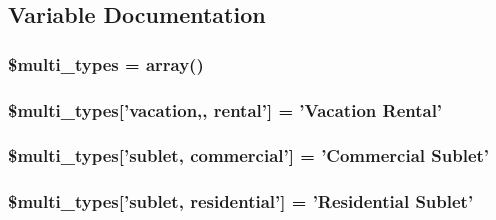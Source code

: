 \subsection{Variable Documentation}
\hypertarget{property__parts_8php_ab4fafae45f9617d14e385aa7a46febfd}{
\subsubsection[{\$multi\_\-types}]{\setlength{\rightskip}{0pt plus 5cm}\$multi\_\-types = array()}}
\label{db/d70/property__parts_8php_ab4fafae45f9617d14e385aa7a46febfd}
\hypertarget{property__parts_8php_a84f08c325359c2ffc08a14f7a1397ca2}{
\subsubsection[{\$multi\_\-types}]{\setlength{\rightskip}{0pt plus 5cm}\$multi\_\-types\mbox{[}'vacation,, rental'\mbox{]} = 'Vacation Rental'}}
\label{db/d70/property__parts_8php_a84f08c325359c2ffc08a14f7a1397ca2}
\hypertarget{property__parts_8php_a527d17f35f9614ce95a35a6dd6c391c3}{
\subsubsection[{\$multi\_\-types}]{\setlength{\rightskip}{0pt plus 5cm}\$multi\_\-types\mbox{[}'sublet, commercial'\mbox{]} = 'Commercial Sublet'}}
\label{db/d70/property__parts_8php_a527d17f35f9614ce95a35a6dd6c391c3}
\hypertarget{property__parts_8php_a5e7262a6e1423f6922813401b816b017}{
\subsubsection[{\$multi\_\-types}]{\setlength{\rightskip}{0pt plus 5cm}\$multi\_\-types\mbox{[}'sublet, residential'\mbox{]} = 'Residential Sublet'}}
\label{db/d70/property__parts_8php_a5e7262a6e1423f6922813401b816b017}
